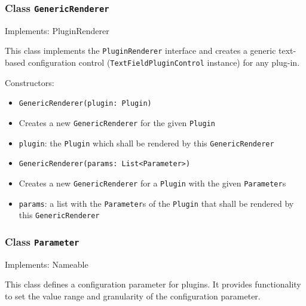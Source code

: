 \documentclass[parskip=full,11pt]{scrartcl}
\begin{document}
\subsubsection{Class \texttt{GenericRenderer}}
Implements: PluginRenderer
 
This class implements the \texttt{PluginRenderer} interface and creates a generic text-based configuration control (\texttt{TextFieldPluginControl} instance) for any plug-in.

Constructors:

\begin{itemize}\itemsep -10pt
	\item \texttt{GenericRenderer(plugin: Plugin)}
	\item[] Creates a new \texttt{GenericRenderer} for the given \texttt{Plugin}
	\item[] \texttt{plugin}: the \texttt{Plugin} which shall be rendered by this \texttt{GenericRenderer}
	
	\item \texttt{GenericRenderer(params: List<Parameter>)}
	\item[] Creates a new \texttt{GenericRenderer} for a \texttt{Plugin} with the given \texttt{Parameter}s
	\item[] \texttt{params}: a list with the \texttt{Parameter}s of the \texttt{Plugin} that shall be rendered by this \texttt{GenericRenderer}
\end{itemize} 

\subsubsection{Class \texttt{Parameter}}
Implements: Nameable
 
This class defines a configuration parameter for plugins. It provides functionality to set the value range and granularity of the configuration parameter.
\end{document}
